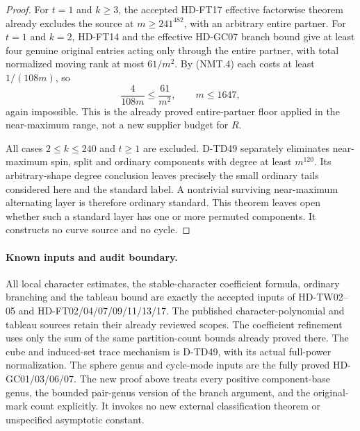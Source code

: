 \begin{proof}
For $t=1$ and $k\ge3$, the accepted HD-FT17 effective
factorwise theorem already excludes the source at
$m\ge241^{482}$, with an arbitrary entire partner.
For $t=1$ and $k=2$, HD-FT14 and the effective HD-GC07
branch bound give at least four genuine original entries
acting only through the entire partner, with total
normalized moving rank at most $61/m^2$.
By (NMT.4) each costs at least $1/(108m)$, so
\[
               \frac4{108m}\le\frac{61}{m^2},
                         \qquad m\le1647,
 \tag{NMT.26}
\]
again impossible.  This is the already proved entire-partner
floor applied in the near-maximum range, not a new supplier
budget for $R$.

All cases $2\le k\le240$ and $t\ge1$ are excluded.
D-TD49 separately eliminates near-maximum spin, split and
ordinary components with degree at least $m^{120}$.
Its arbitrary-shape degree conclusion leaves precisely the
small ordinary tails considered here and the standard label.
A nontrivial surviving near-maximum alternating layer is
therefore ordinary standard.  This theorem leaves open
whether such a standard layer has one or more permuted
components.  It constructs no curve source and no cycle.
\end{proof}

\paragraph{Known inputs and audit boundary.}
All local character estimates, the stable-character coefficient
formula, ordinary branching and the tableau bound are exactly
the accepted inputs of HD-TW02--05 and HD-FT02/04/07/09/11/13/17.
The published character-polynomial and tableau sources retain
their already reviewed scopes.\cite{HD:GarsiaGoupil2009,HD:MSP2007}
The coefficient refinement uses only the sum of the same
partition-count bounds already proved there.
The cube and induced-set trace mechanism is D-TD49, with its
actual full-power normalization.  The sphere genus and cycle-mode
inputs are the fully proved HD-GC01/03/06/07.
The new proof above treats every positive component-base genus,
the bounded pair-genus version of the branch argument, and the
original-mark count explicitly.  It invokes no new external
classification theorem or unspecified asymptotic constant.
